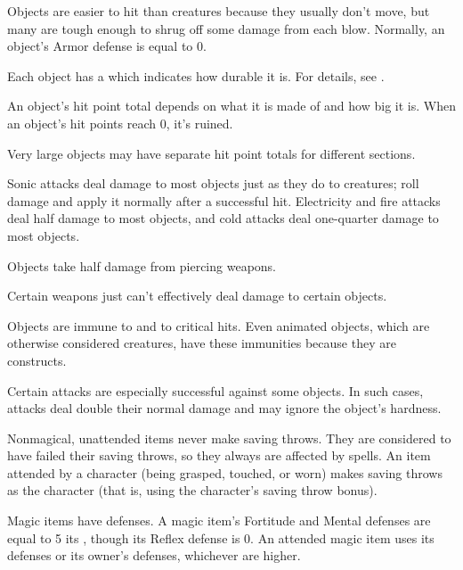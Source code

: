  Objects are easier to hit than creatures because they usually don't move, but many are tough enough to shrug off some damage from each blow.
Normally, an object's Armor defense is equal to 0.

 Each object has a  which indicates how durable it is.
For details, see .

 An object's hit point total depends on what it is made of and how big it is. When an object's hit points reach 0, it's ruined.

Very large objects may have separate hit point totals for different sections.

 Sonic attacks deal damage to most objects just as they do to creatures; roll damage and apply it normally after a successful hit. Electricity and fire attacks deal half damage to most objects, and cold attacks deal one-quarter damage to most objects.

 Objects take half damage from piercing weapons.

 Certain weapons just can't effectively deal damage to certain objects.

 Objects are immune to  and to critical hits. Even animated objects, which are otherwise considered creatures, have these immunities because they are constructs.

 Certain attacks are especially successful against some objects. In such cases, attacks deal double their normal damage and may ignore the object's hardness.

 Nonmagical, unattended items never make saving throws. They are considered to have failed their saving throws, so they always are affected by spells. An item attended by a character (being grasped, touched, or worn) makes saving throws as the character (that is, using the character's saving throw bonus).

\par Magic items have defenses. A magic item's Fortitude and Mental defenses are equal to 5 \add its , though its Reflex defense is 0. An attended magic item uses its defenses or its owner's defenses, whichever are higher.

